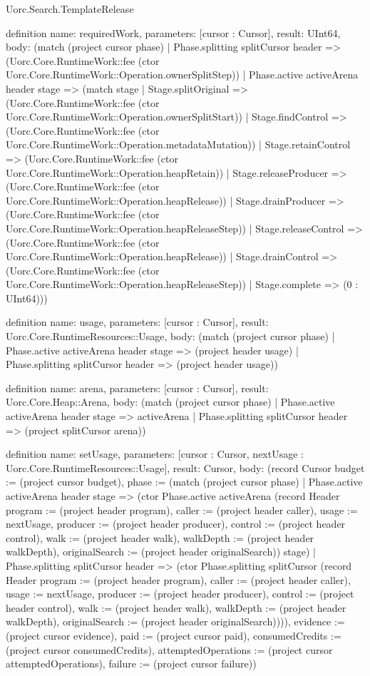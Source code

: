 \begin{lexlean}{Uorc.Search.TemplateRelease}
\begin{semanticmodule}
definition{
  name: requiredWork,
  parameters: [cursor : Cursor],
  result: UInt64,
  body: (match (project cursor phase)
    | Phase.splitting splitCursor header => (Uorc.Core.RuntimeWork::fee (ctor Uorc.Core.RuntimeWork::Operation.ownerSplitStep))
    | Phase.active activeArena header stage => (match stage
      | Stage.splitOriginal => (Uorc.Core.RuntimeWork::fee (ctor Uorc.Core.RuntimeWork::Operation.ownerSplitStart))
      | Stage.findControl => (Uorc.Core.RuntimeWork::fee (ctor Uorc.Core.RuntimeWork::Operation.metadataMutation))
      | Stage.retainControl => (Uorc.Core.RuntimeWork::fee (ctor Uorc.Core.RuntimeWork::Operation.heapRetain))
      | Stage.releaseProducer => (Uorc.Core.RuntimeWork::fee (ctor Uorc.Core.RuntimeWork::Operation.heapRelease))
      | Stage.drainProducer => (Uorc.Core.RuntimeWork::fee (ctor Uorc.Core.RuntimeWork::Operation.heapReleaseStep))
      | Stage.releaseControl => (Uorc.Core.RuntimeWork::fee (ctor Uorc.Core.RuntimeWork::Operation.heapRelease))
      | Stage.drainControl => (Uorc.Core.RuntimeWork::fee (ctor Uorc.Core.RuntimeWork::Operation.heapReleaseStep))
      | Stage.complete => (0 : UInt64)))
}

definition{
  name: usage,
  parameters: [cursor : Cursor],
  result: Uorc.Core.RuntimeResources::Usage,
  body: (match (project cursor phase)
    | Phase.active activeArena header stage => (project header usage)
    | Phase.splitting splitCursor header => (project header usage))
}

definition{
  name: arena,
  parameters: [cursor : Cursor],
  result: Uorc.Core.Heap::Arena,
  body: (match (project cursor phase)
    | Phase.active activeArena header stage => activeArena
    | Phase.splitting splitCursor header => (project splitCursor arena))
}

definition{
  name: setUsage,
  parameters: [cursor : Cursor, nextUsage : Uorc.Core.RuntimeResources::Usage],
  result: Cursor,
  body: (record Cursor {budget := (project cursor budget), phase := (match (project cursor phase)
    | Phase.active activeArena header stage => (ctor Phase.active activeArena (record Header {program := (project header program), caller := (project header caller), usage := nextUsage, producer := (project header producer), control := (project header control), walk := (project header walk), walkDepth := (project header walkDepth), originalSearch := (project header originalSearch)}) stage)
    | Phase.splitting splitCursor header => (ctor Phase.splitting splitCursor (record Header {program := (project header program), caller := (project header caller), usage := nextUsage, producer := (project header producer), control := (project header control), walk := (project header walk), walkDepth := (project header walkDepth), originalSearch := (project header originalSearch)}))), evidence := (project cursor evidence), paid := (project cursor paid), consumedCredits := (project cursor consumedCredits), attemptedOperations := (project cursor attemptedOperations), failure := (project cursor failure)})
}


\end{semanticmodule}
\end{lexlean}

